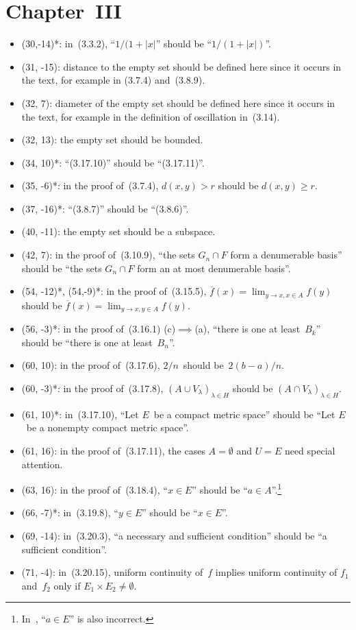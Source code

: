 \documentclass[letterpaper,12pt]{article}
\newcommand{\union}{\cup}
\newcommand{\sect}{\cap}
\newcommand{\abs}[1]{|{#1}|}
\begin{document}
\section*{Chapter~III}
\begin{itemize}
\item (30,-14)*: in~(3.3.2), ``\(1/(1+\abs{x}\)'' should be ``\(1/(1+\abs{x})\)''.
\item (31, -15): distance to the empty set should be defined here since it occurs in the text, for example in (3.7.4) and~(3.8.9).
\item (32, 7): diameter of the empty set should be defined here since it occurs in the text, for example in the definition of oscillation in~(3.14).
\item (32, 13): the empty set should be bounded.
\item (34, 10)*: ``(3.17.10)'' should be ``(3.17.11)''.
\item (35, -6)*: in the proof of~(3.7.4), \(d(x,y)>r\) should be \(d(x,y)\ge r\).
\item (37, -16)*: ``(3.8.7)'' should be ``(3.8.6)''.
\item (40, -11): the empty set should be a subspace.
\item (42, 7): in the proof of~(3.10.9), ``the sets \(G_n\sect F\) form a denumerable basis'' should be ``the sets \(G_n\sect F\) form an at most denumerable basis''.
\item (54, -12)*, (54,-9)*: in the proof of~(3.15.5), \(\overline{f}(x)=\lim_{y\to x,x\in A}f(y)\) should be \(\overline{f}(x)=\lim_{y\to x,y\in A}f(y)\).
\item (56, -3)*: in the proof of~(3.16.1) (c)\(\implies\)(a), ``there is one at least~\(B_k\)'' should be ``there is one at least~\(B_n\)''.
\item (60, 10): in the proof of~(3.17.6), \(2/n\)~should be~\(2(b-a)/n\).
\item (60, -3)*: in the proof of~(3.17.8), \((A\union V_{\lambda})_{\lambda\in H}\) should be \((A\sect V_{\lambda})_{\lambda\in H}\).
\item (61, 10)*: in~(3.17.10), ``Let \(E\)~be a compact metric space'' should be ``Let \(E\)~be a nonempty compact metric space''.
\item (61, 16): in the proof of~(3.17.11), the cases \(A=\emptyset\) and \(U=E\) need special attention.
\item (63, 16): in the proof of~(3.18.4), ``\(x\in E\)'' should be ``\(a\in A\)''.\footnote{In~\cite{dieudonne9th}, ``\(a\in E\)'' is also incorrect.}
\item (66, -7)*: in~(3.19.8), ``\(y\in E\)'' should be ``\(x\in E\)''.
\item (69, -14): in~(3.20.3), ``a necessary and sufficient condition'' should be ``a sufficient condition''.
\item (71, -4): in~(3.20.15), uniform continuity of~\(f\) implies uniform continuity of \(f_1\) and~\(f_2\) only if \(E_1\times E_2\ne\emptyset\).
\end{itemize}
\end{document}
